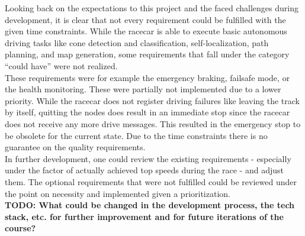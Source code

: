 Looking back on the expectations to this project and the faced challenges during development, it is clear that not every requirement could be fulfilled with the given time constraints. While the racecar is able to execute basic autonomous driving tasks like cone detection and classification, self-localization, path planning, and map generation, some requirements that fall under the category ``could have'' were not realized.\\
\newline
These requirements were for example the emergency braking, failsafe mode, or the health monitoring. These were partially not implemented due to a lower priority. While the racecar does not register driving failures like leaving the track by itself, quitting the nodes does result in an immediate stop since the racecar does not receive any more drive messages. This resulted in the emergency stop to be obsolete for the current state. Due to the time constraints there is no guarantee on the quality requirements. \\
\newline
In further development, one could review the existing requirements - especially under the factor of actually achieved top speeds during the race - and adjust them. The optional requirements that were not fulfilled could be reviewed under the point on necessity and implemented given a prioritization. \\
\newline
\textbf{TODO: What could be changed in the development process, the tech stack, etc. for further improvement and for future iterations of the course?}
